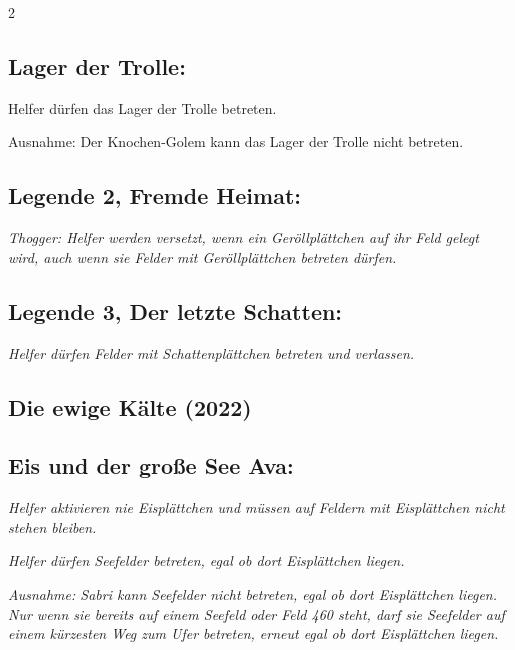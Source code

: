\documentclass[10pt, a4paper, oneside]{book}
\newcommand{\fan}[1]{\textit{#1}}
\begin{document}
\begin{multicols*}{2}
\begin{bgcolor}[color-dz]
\subsection{Lager der Trolle:}

Helfer dürfen das Lager der Trolle betreten.
\supercite{dz-begleitheft,mh-begleitheft,130389}

Ausnahme: Der Knochen-Golem kann das Lager der Trolle nicht betreten.
\supercite{dz-begleitheft}





\subsection{Legende 2, Fremde Heimat:}

\fan{Thogger: Helfer werden versetzt, wenn ein Geröllplättchen auf ihr Feld gelegt wird, auch wenn sie Felder mit Geröllplättchen betreten dürfen.}



\subsection{Legende 3, Der letzte Schatten:}

\fan{Helfer dürfen Felder mit Schattenplättchen betreten und verlassen.}

\end{bgcolor}








\begin{bgcolor}
\section{Die ewige Kälte (2022)}

\subsection{Eis und der große See Ava:}

\fan{Helfer aktivieren nie Eisplättchen und müssen auf Feldern mit Eisplättchen nicht stehen bleiben.}

\fan{Helfer dürfen Seefelder betreten, egal ob dort Eisplättchen liegen.}

\fan{Ausnahme: Sabri kann Seefelder nicht betreten, egal ob dort Eisplättchen liegen. Nur wenn sie bereits auf einem Seefeld oder Feld 460 steht, darf sie Seefelder auf einem kürzesten Weg zum Ufer betreten, erneut egal ob dort Eisplättchen liegen.}



\end{bgcolor}
\end{multicols*}
\end{document}
